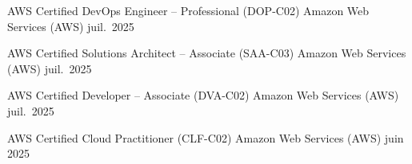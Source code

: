 

\begin{cvhonors}

  \cvhonor
    {AWS Certified DevOps Engineer -- Professional (DOP-C02)}
    {Amazon Web Services (AWS)}
    {}
    {juil.\ 2025}

  \cvhonor
    {AWS Certified Solutions Architect -- Associate (SAA-C03)}
    {Amazon Web Services (AWS)}
    {}
    {juil.\ 2025}

  \cvhonor
    {AWS Certified Developer -- Associate (DVA-C02)}
    {Amazon Web Services (AWS)}
    {}
    {juil.\ 2025}

  \cvhonor
    {AWS Certified Cloud Practitioner (CLF-C02)}
    {Amazon Web Services (AWS)}
    {}
    {juin 2025}

\end{cvhonors}
